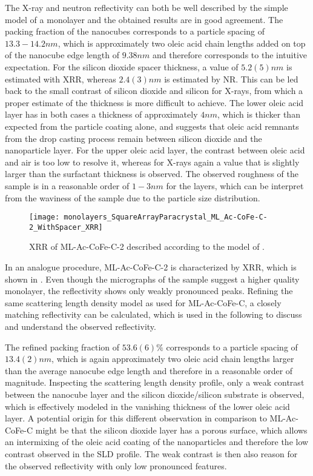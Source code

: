 \documentclass[\main/dresen_thesis.tex]{subfiles}
\begin{document}
  The X-ray and neutron reflectivity can both be well described by the simple model of a monolayer and the obtained results are in good agreement.
  The packing fraction of the nanocubes corresponds to a particle spacing of $13.3 - 14.2 \unit{nm}$, which is approximately two oleic acid chain lengths added on top of the nanocube edge length of $9.38 \unit{nm}$ and therefore corresponds to the intuitive expectation.
  For the silicon dioxide spacer thickness, a value of $5.2(5) \unit{nm}$ is estimated with  XRR, whereas $2.4(3) \unit{nm}$ is estimated by NR.
  This can be led back to the small contrast of silicon dioxide and silicon for X-rays, from which a proper estimate of the thickness is more difficult to achieve.
  The lower oleic acid layer has in both cases a thickness of approximately $4 \unit{nm}$, which is thicker than expected from the particle coating alone, and suggests that oleic acid remnants from the drop casting process remain between silicon dioxide and the nanoparticle layer.
  For the upper oleic acid layer, the contrast between oleic acid and air is too low to resolve it, whereas for X-rays again a value that is slightly larger than the surfactant thickness is observed.
  The observed roughness of the sample is in a reasonable order of $1 - 3 \unit{nm}$ for the layers, which can be interpret from the waviness of the sample \eg due to the particle size distribution.

  \begin{figure}[tb]
    \centering
    \texttt{[image: monolayers\_SquareArrayParacrystal\_ML\_Ac-CoFe-C-2\_WithSpacer\_XRR]}
    \caption{\label{fig:monolayers:structure:squareArrayParacrystal:XRR}XRR of ML-Ac-CoFe-C-2 described according to the model of .}
  \end{figure}

  In an analogue procedure, ML-Ac-CoFe-C-2 is characterized by XRR, which is shown in .
  Even though the micrographs of the sample suggest a higher quality monolayer, the reflectivity shows only weakly pronounced peaks.
  Refining the same scattering length density model as used for ML-Ac-CoFe-C, a closely matching reflectivity can be calculated, which is used in the following to discuss and understand the observed reflectivity.

  The refined packing fraction of $53.6(6) \%$ corresponds to a particle spacing of $13.4(2) \unit{nm}$, which is again approximately two oleic acid chain lengths larger than the average nanocube edge length and therefore in a reasonable order of magnitude.
  Inspecting the scattering length density profile, only a weak contrast between the nanocube layer and the silicon dioxide/silicon substrate is observed, which is effectively modeled in the vanishing thickness of the lower oleic acid layer.
  A potential origin for this different observation in comparison to ML-Ac-CoFe-C might be that the silicon dioxide layer has a porous surface, which allows an intermixing of the oleic acid coating of the nanoparticles and therefore the low contrast observed in the SLD profile.
  The weak contrast is then also reason for the observed reflectivity with only low pronounced features.
\end{document}

